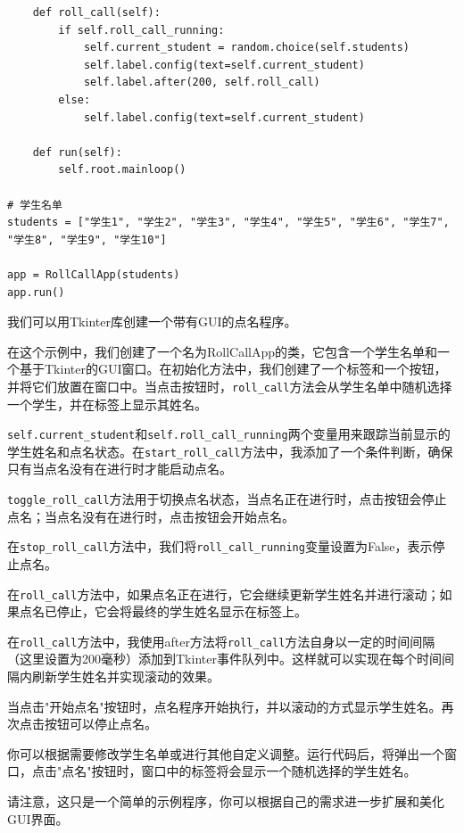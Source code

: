 \documentclass[10pt]{elegantnote}
\begin{document}
\begin{sloppypar}
\begin{lstlisting}
    def roll_call(self):
        if self.roll_call_running:
            self.current_student = random.choice(self.students)
            self.label.config(text=self.current_student)
            self.label.after(200, self.roll_call)
        else:
            self.label.config(text=self.current_student)

    def run(self):
        self.root.mainloop()

# 学生名单
students = ["学生1", "学生2", "学生3", "学生4", "学生5", "学生6", "学生7", "学生8", "学生9", "学生10"]

app = RollCallApp(students)
app.run()
\end{lstlisting}

\begin{framed}
    我们可以用Tkinter库创建一个带有GUI的点名程序。

    在这个示例中，我们创建了一个名为RollCallApp的类，它包含一个学生名单和一个基于Tkinter的GUI窗口。在初始化方法中，我们创建了一个标签和一个按钮，并将它们放置在窗口中。当点击按钮时，\verb|roll_call|方法会从学生名单中随机选择一个学生，并在标签上显示其姓名。

    \verb|self.current_student|和\verb|self.roll_call_running|两个变量用来跟踪当前显示的学生姓名和点名状态。在\verb|start_roll_call|方法中，我添加了一个条件判断，确保只有当点名没有在进行时才能启动点名。

    

    \verb|toggle_roll_call|方法用于切换点名状态，当点名正在进行时，点击按钮会停止点名；当点名没有在进行时，点击按钮会开始点名。

在\verb|stop_roll_call|方法中，我们将\verb|roll_call_running|变量设置为False，表示停止点名。

在\verb|roll_call|方法中，如果点名正在进行，它会继续更新学生姓名并进行滚动；如果点名已停止，它会将最终的学生姓名显示在标签上。

在\verb|roll_call|方法中，我使用after方法将\verb|roll_call|方法自身以一定的时间间隔（这里设置为200毫秒）添加到Tkinter事件队列中。这样就可以实现在每个时间间隔内刷新学生姓名并实现滚动的效果。

    当点击"开始点名"按钮时，点名程序开始执行，并以滚动的方式显示学生姓名。再次点击按钮可以停止点名。

    你可以根据需要修改学生名单或进行其他自定义调整。运行代码后，将弹出一个窗口，点击"点名"按钮时，窗口中的标签将会显示一个随机选择的学生姓名。

    请注意，这只是一个简单的示例程序，你可以根据自己的需求进一步扩展和美化GUI界面。
\end{framed}


\end{sloppypar}
\end{document}
